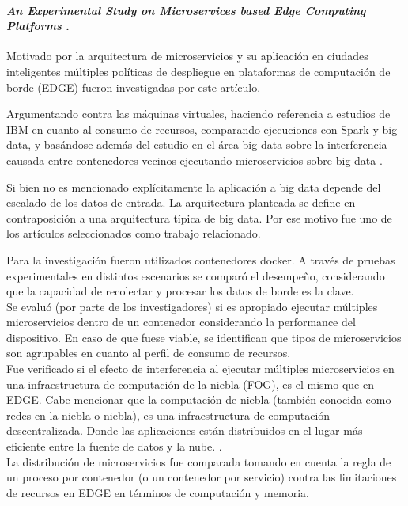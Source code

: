 \paragraph{
\textbf{\emph{An Experimental Study on Microservices based Edge Computing Platforms}}
\cite{qu_experimental_2020}.
}

Motivado por la arquitectura de microservicios y su aplicación en ciudades inteligentes
múltiples políticas de despliegue en plataformas de computación de borde (EDGE) fueron investigadas por este artículo.

Argumentando contra las máquinas virtuales, haciendo referencia a estudios de IBM en cuanto al consumo de recursos, 
comparando ejecuciones con Spark \cite{ApacheSpark} y big data, y basándose además del estudio en el área big data sobre la interferencia causada entre contenedores vecinos ejecutando microservicios sobre big data \cite{BigDataWikipedia}.

Si bien no es mencionado explícitamente la aplicación a big data depende del escalado de los datos de entrada. La arquitectura planteada se define en contraposición a una arquitectura típica de big data. Por ese motivo fue uno de los artículos seleccionados como trabajo relacionado.

Para la investigación fueron utilizados contenedores docker. A través de pruebas experimentales en distintos escenarios se comparó el desempeño, considerando que la capacidad de recolectar y procesar los datos de borde es la clave.\\
Se evaluó (por parte de los investigadores) si es apropiado ejecutar múltiples microservicios dentro de un contenedor considerando la performance del dispositivo.
En caso de que fuese viable, se identifican que tipos de microservicios son agrupables en cuanto al perfil de consumo de recursos.\\
Fue verificado si el efecto de interferencia al ejecutar múltiples microservicios en una infraestructura de computación de la niebla (FOG), es el mismo que en EDGE. Cabe mencionar que la computación de niebla (también conocida como redes en la niebla o niebla),
es una infraestructura de computación descentralizada. Donde las aplicaciones están distribuidos en el lugar más eficiente entre la fuente de datos y la nube.
\cite{webfog}.
\\
La distribución de microservicios fue comparada tomando en cuenta la regla de un proceso por contenedor (o un contenedor por servicio) 
\cite{cont_por_serv} 
contra las limitaciones de recursos en EDGE en términos de computación y memoria.

